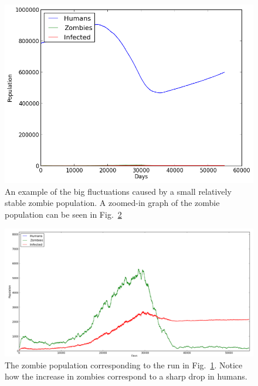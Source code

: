 \documentclass{report}
\begin{document}
\begin{figure}
\includegraphics[width=350pt]{plots/zombiesstable}
\caption{An example of the big fluctuations caused by a small relatively stable zombie population. A zoomed-in graph of the zombie population can be seen in Fig.~\ref{zombiesstablezoomed}}
\label{zombiesstable}
\end{figure}
\begin{figure}
\includegraphics[width=350pt]{plots/zombiesstablezoomed}
\caption{The zombie population corresponding to the run in Fig.~\ref{zombiesstable}. Notice how the increase in zombies correspond to a sharp drop in humans.}
\label{zombiesstablezoomed}
\end{figure}



\end{document}
